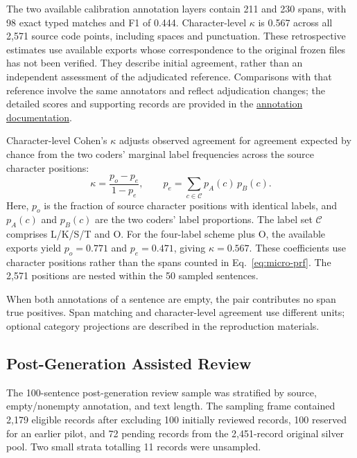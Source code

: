 The two available calibration annotation layers contain 211 and 230 spans, with 98 exact typed matches and F1 of 0.444. Character-level $\kappa$ is 0.567 across all 2,571 source code points, including spaces and punctuation. These retrospective estimates use available exports whose correspondence to the original frozen files has not been verified. They describe initial agreement, rather than an independent assessment of the adjudicated reference. Comparisons with that reference involve the same annotators and reflect adjudication changes; the detailed scores and supporting records are provided in the \href{https://github.com/AlfredJamesLi/chinese-skillspan-benchmark/blob/main/reproduction/annotation_documentation_20261007/README.md}{annotation documentation}.

Character-level Cohen's $\kappa$ adjusts observed agreement for agreement expected by chance from the two coders' marginal label frequencies across the source character positions:
\begin{equation}
\kappa=\frac{p_o-p_e}{1-p_e},
\qquad p_e=\sum_{c\in\mathcal{C}}p_A(c)\,p_B(c).
\label{eq:character-kappa}
\end{equation}
Here, $p_o$ is the fraction of source character positions with identical labels, and $p_A(c)$ and $p_B(c)$ are the two coders' label proportions. The label set $\mathcal{C}$ comprises L/K/S/T and O. For the four-label scheme plus O, the available exports yield $p_o=0.771$ and $p_e=0.471$, giving $\kappa=0.567$. These coefficients use character positions rather than the spans counted in Eq.~\eqref{eq:micro-prf}. The 2,571 positions are nested within the 50 sampled sentences.

When both annotations of a sentence are empty, the pair contributes no span true positives. Span matching and character-level agreement use different units; optional category projections are described in the reproduction materials.

\subsection{Post-Generation Assisted Review}
The 100-sentence post-generation review sample was stratified by source, empty/nonempty annotation, and text length. The sampling frame contained 2,179 eligible records after excluding 100 initially reviewed records, 100 reserved for an earlier pilot, and 72 pending records from the 2,451-record original silver pool. Two small strata totalling 11 records were unsampled.

